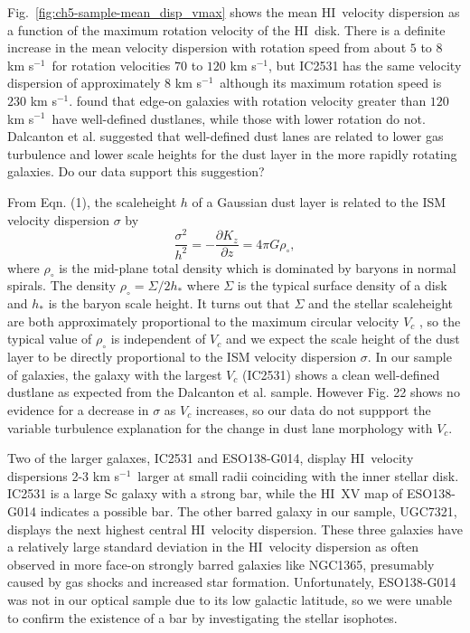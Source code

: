 \documentclass[traditabstract]{aa} %
\newcommand\HI{H{\small I}}
\newcommand\kms{km s$^{-1}$}
\begin{document}
Fig.~\ref{fig:ch5-sample-mean_disp_vmax} shows the mean \HI\
velocity dispersion as a function of the maximum
rotation velocity of the \HI\ disk. There is a definite increase in
the mean velocity dispersion with rotation speed from about $5$ to $8$
\kms\ for rotation velocities $70$ to $120$ \kms, but IC2531 has the same velocity
dispersion of approximately $8$ \kms\ although its maximum rotation speed is
$230$ \kms. \citet{dyb2004} found that edge-on galaxies with rotation velocity
greater than $120$ \kms\ have well-defined dustlanes, while those with lower
rotation do not. Dalcanton
et al. suggested that well-defined dust lanes are related to
lower gas turbulence and lower scale heights for the dust layer
in the more rapidly rotating galaxies. Do our data support this
suggestion?

From Eqn. (1), the scaleheight $h$ of a Gaussian dust layer is
related to the ISM velocity dispersion $\sigma$ by
\begin{equation}
\frac{\sigma^2}{h^2} = - \frac{\partial K_z}{\partial z}
= 4\pi G \rho_\circ,
\end{equation}
where $\rho_\circ$ is the mid-plane total density which is
dominated by baryons in normal spirals. The density $\rho_\circ =
\Sigma/2h_*$ where $\Sigma$ is the typical surface density of a
disk and $h_*$ is the baryon scale height.  It turns out that
$\Sigma$ and the stellar scaleheight are both approximately
proportional to the maximum circular velocity $V_c$ \citep{gfjp09,kvdkdg02}, 
so the typical value of $\rho_\circ$
is independent of $V_c$ and we expect the scale height of the dust
layer to be directly proportional to the ISM velocity dispersion
$\sigma$. In our sample of galaxies, the galaxy with the largest
$V_c$ (IC2531) shows a clean well-defined dustlane as expected
from the Dalcanton et al. sample. However Fig. 22 shows no evidence
for a decrease in $\sigma$ as $V_c$ increases, so our data do not
suppport the variable turbulence explanation for the change in dust
lane morphology with $V_c$.

Two of the larger galaxes, IC2531 and ESO138-G014, display \HI\
velocity dispersions 2-3 \kms\ larger at small radii coinciding with
the inner stellar disk. IC2531 is a large Sc galaxy with a strong bar,
while the \HI\ XV map of ESO138-G014 indicates a possible bar.  The
other barred galaxy in our sample, UGC7321, displays the next highest
central \HI\ velocity dispersion.
These three galaxies have a relatively large standard deviation in 
the \HI\ velocity dispersion as often observed in more face-on
strongly barred galaxies like NGC1365, presumably caused
by gas shocks and increased star formation. Unfortunately, 
ESO138-G014 was not in our optical sample due to its low galactic latitude, so we
were unable to confirm the existence of a bar by investigating the
stellar isophotes. 
\end{document}
